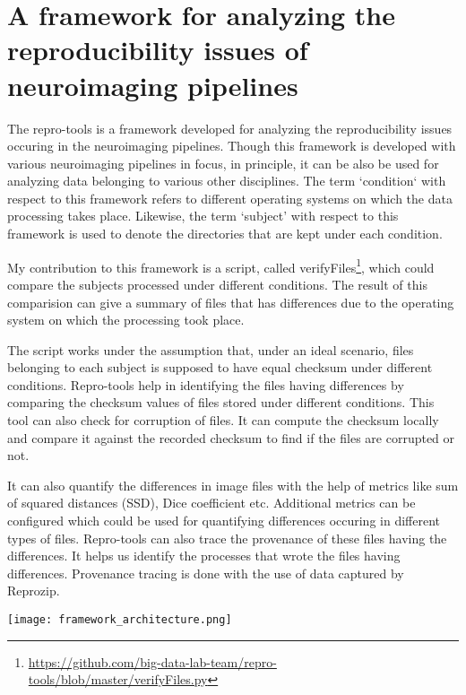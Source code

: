 \chapter{A framework for analyzing the reproducibility issues of neuroimaging pipelines}
The repro-tools  is a framework developed for analyzing the reproducibility issues occuring in the neuroimaging pipelines. Though this framework is developed with various neuroimaging pipelines in focus, in principle, it can be also be used for analyzing data belonging to various other disciplines. The term `condition` with respect to this framework refers to different operating systems on which the data processing takes place. Likewise, the term `subject' with respect to this framework is used to denote the directories that are kept under each condition. 

My contribution to this framework is a script, called verifyFiles\footnote{\url{https://github.com/big-data-lab-team/repro-tools/blob/master/verifyFiles.py}}, which could compare the subjects processed under different conditions. The result of this comparision can give a summary of files that has differences due to the operating system on which the processing took place.

The script works under the assumption that, under an ideal scenario, files belonging to each subject is supposed to have equal checksum under different conditions. Repro-tools help in identifying the files having differences by comparing the checksum values of files stored under different conditions. This tool can also check for corruption of files. It can compute the checksum locally and compare it against the recorded checksum to find if the files are corrupted or not.

It can also quantify the differences in image files with the help of metrics like sum of squared distances (SSD), Dice coefficient etc. Additional metrics can be configured which could be used for quantifying differences occuring in different types of files. Repro-tools can also trace the provenance of these files having the differences. It helps us identify the processes that wrote the files having differences. Provenance tracing is done with the use of data captured by Reprozip.


\begin{center}
\texttt{[image: framework\_architecture.png]}
\label{fig:framework_architecture}
\end{center}

